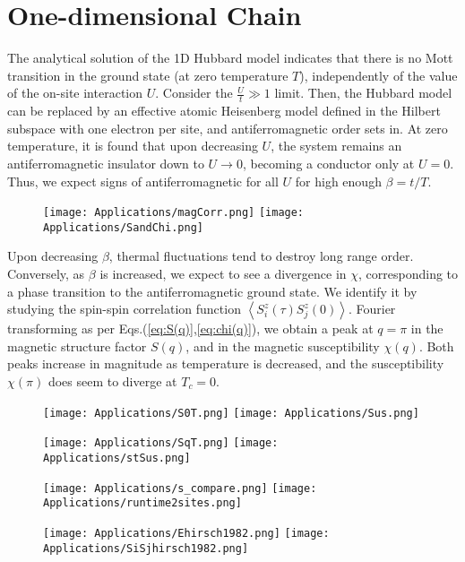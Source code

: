 \section{One-dimensional Chain}
\label{sec:1d-chain}

The analytical solution of the \acs{1D} Hubbard model indicates that there is no Mott transition \cite{lieb_absence_1968} in the ground state (at zero temperature $T$), independently of the value of the on-site interaction $U$.
Consider the $\frac{U}{t} \gg 1$ limit. 
Then, the Hubbard model can be replaced by an effective atomic Heisenberg model defined in the Hilbert subspace with one electron per site, and antiferromagnetic order sets in.
At zero temperature, it is found that upon decreasing $U$, the system remains an antiferromagnetic insulator down to $U \rightarrow 0$, becoming a conductor only at $U = 0$.
Thus, we expect signs of antiferromagnetic for all $U$ for high enough $\beta = t / T$.
\begin{figure}[H]\label{fig:corr_FT}
\texttt{[image: Applications/magCorr.png]}
\hspace{-0.5cm}
\texttt{[image: Applications/SandChi.png]}
\caption[]{}
\end{figure}

Upon decreasing $\beta$, thermal fluctuations tend to destroy long range order.
Conversely, as $\beta$ is increased, we expect to see a divergence in $\chi$, corresponding to a phase transition to the antiferromagnetic ground state.
We identify it by studying the spin-spin correlation function $\left\langle S^z_i (\tau) S^z_j (0) \right\rangle$.
Fourier transforming as per Eqs.(\ref{eq:S(q)},\ref{eq:chi(q)}), we obtain a peak at $q = \pi$ in the magnetic structure factor $S ( q ) $, and in the magnetic susceptibility $\chi (q)$.
Both peaks increase in magnitude as temperature is decreased, and the  susceptibility $\chi (\pi)$ does seem to diverge at $T_c = 0$.
\begin{figure}[H]\label{fig:Schi0}
\texttt{[image: Applications/S0T.png]}
\texttt{[image: Applications/Sus.png]}
\caption[]{}
\end{figure}
\vspace{-0.5cm}
\begin{figure}[H]\label{fig:SchiPi}
\texttt{[image: Applications/SqT.png]}
\texttt{[image: Applications/stSus.png]}
\caption[]{}
\end{figure}
\vspace{-0.5cm}
\begin{figure}[H]\label{fig:quest_time}
\texttt{[image: Applications/s\_compare.png]}
\texttt{[image: Applications/runtime2sites.png]}
\caption[]{}
\end{figure}
\vspace{-0.5cm}
\begin{figure}[H]\label{fig:hirsch1982}
\texttt{[image: Applications/Ehirsch1982.png]}
\hspace{-0.5cm}
\texttt{[image: Applications/SiSjhirsch1982.png]}
\caption[]{}
\end{figure}
